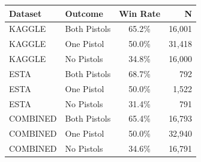 \documentclass[10pt]{article}
\begin{document}
\thispagestyle{empty}

\begin{table}[h]
\centering
\small
\begin{tabular}{llcr}
\toprule
\textbf{Dataset} & \textbf{Outcome} & \textbf{Win Rate} & \textbf{N} \\
\midrule
KAGGLE & Both Pistols & 65.2\% & 16,001 \\
KAGGLE & One Pistol & 50.0\% & 31,418 \\
KAGGLE & No Pistols & 34.8\% & 16,000 \\
\midrule
ESTA & Both Pistols & 68.7\% & 792 \\
ESTA & One Pistol & 50.0\% & 1,522 \\
ESTA & No Pistols & 31.4\% & 791 \\
\midrule
COMBINED & Both Pistols & 65.4\% & 16,793 \\
COMBINED & One Pistol & 50.0\% & 32,940 \\
COMBINED & No Pistols & 34.6\% & 16,791 \\
\bottomrule
\end{tabular}
\end{table}
\end{document}
